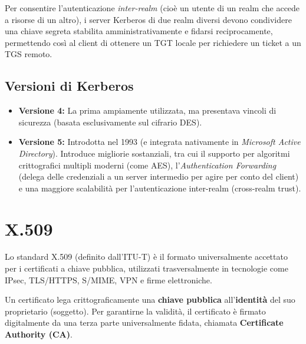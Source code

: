 Per consentire l'autenticazione \textit{inter-realm} (cioè un utente di un realm che accede a risorse di un altro), i server Kerberos di due realm diversi devono condividere una chiave segreta stabilita amministrativamente e fidarsi reciprocamente, permettendo così al client di ottenere un TGT locale per richiedere un ticket a un TGS remoto.

\subsection{Versioni di Kerberos}
\begin{itemize}
    \item \textbf{Versione 4:} La prima ampiamente utilizzata, ma presentava vincoli di sicurezza (basata esclusivamente sul cifrario DES).
    \item \textbf{Versione 5:} Introdotta nel 1993 (e integrata nativamente in \textit{Microsoft Active Directory}). Introduce migliorie sostanziali, tra cui il supporto per algoritmi crittografici multipli moderni (come AES), l'\textit{Authentication Forwarding} (delega delle credenziali a un server intermedio per agire per conto del client) e una maggiore scalabilità per l'autenticazione inter-realm (cross-realm trust).
\end{itemize}

\section{X.509}

Lo standard X.509 (definito dall'ITU-T) è il formato universalmente accettato per i certificati a chiave pubblica, utilizzati trasversalmente in tecnologie come IPsec, TLS/HTTPS, S/MIME, VPN e firme elettroniche. 

\begin{defbox}
Un certificato lega crittograficamente una \textbf{chiave pubblica} all'\textbf{identità} del suo proprietario (soggetto). Per garantirne la validità, il certificato è firmato digitalmente da una terza parte universalmente fidata, chiamata \textbf{Certificate Authority (CA)}.
\end{defbox}

